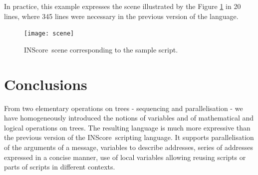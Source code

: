 \documentclass{article}
\newcommand{\IS}		{INScore}
\begin{document}
In practice, this example expresses the scene illustrated by the Figure \ref{samplescene} in 20 lines, where 345 lines were necessary in the previous version of the language.  

\begin{figure}[htbp]
\begin{center}
\texttt{[image: scene]}
\caption{\IS\ scene corresponding to the sample script.}
\label{samplescene}
\end{center}
\end{figure}


\section{Conclusions}
From two elementary operations on trees - sequencing and parallelisation - we have homogeneously introduced the notions of variables and of mathematical and logical operations on trees. The resulting language is much more expressive than the  previous version of the \IS\ scripting language. 
It supports parallelisation of the arguments of a message, variables to describe addresses, series of addresses expressed in a concise manner, use of local variables allowing reusing scripts or parts of scripts in different contexts.



\balance

\end{document}
